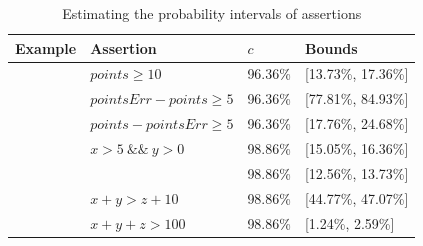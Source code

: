\documentclass[runningheads]{llncs}
\begin{document}
\begin{table}[htb]
	\centering
	\caption{Estimating the probability intervals of assertions}
	\label{AssertionsResults} 
	\begin{tabular}{|m{55pt}<{\centering} |m{130pt}<{\centering} |m{50pt}<{\centering} |m{85pt}<{\centering}|}
		\hline  
		Example & Assertion &  $c$ & Bounds \\ \hline

		\multirow{3}{*}{\makecell[c]{framingham}}
		& $points \geq 10$ & 96.36\% & [13.73\%, 17.36\%] \\ \cline{2-4}
		& $pointsErr-points \geq 5$ & 96.36\% & [77.81\%, 84.93\%]  \\ \cline{2-4}
		& $points-pointsErr \geq 5$ & 96.36\% & [17.76\%, 24.68\%]  \\ \hline
		\multirow{5}{*}{\makecell[c]{sum-three}}
		& $x>5 \ \&\& \ y>0$ & 98.86\% & [15.05\%, 16.36\%]  \\ \cline{2-4}
		&  \makecell[c]{$x>0 \ \&\&\ y>0 \&\& \ z>0$} & 98.86\% & [12.56\%, 13.73\%] \\ \cline{2-4}
		& $x+y>z+10$ & 98.86\% & [44.77\%, 47.07\%] \\ \cline{2-4}
		& $x+y+z>100$ & 98.86\% & [1.24\%, 2.59\%]  \\ \hline

	\end{tabular}  
\end{table}
\end{document}
